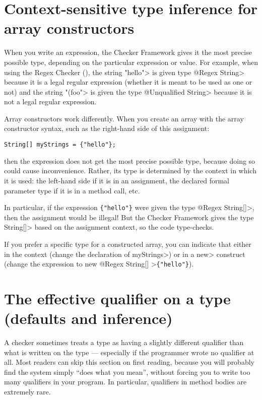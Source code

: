 \section{Context-sensitive type inference for array constructors\label{array-context-sensitive}}

When you write an expression, the Checker Framework gives it the most
precise possible type, depending on the particular expression or value.
For example, when using the Regex Checker (),
the string \<"hello"> is given type \<@Regex String> because it is a legal
regular expression (whether it is meant to be used as one or not) and the
string \<"(foo"> is given the type \<@Unqualified String> because it is not
a legal regular expression.

Array constructors work differently.  When you create an array with the
array constructor syntax, such as the right-hand side of this assignment:

\begin{Verbatim}
String[] myStrings = {"hello"};
\end{Verbatim}

\noindent
then the expression does not get the most precise possible type, because
doing so could cause inconvenience.  Rather, its type is determined by the
context in which it is used:  the left-hand side if it is in an assignment,
the declared formal parameter type if it is in a method call, etc.

In particular, if the expression \verb|{"hello"}| were given the type
\<@Regex String[]>, then the assignment would be illegal!  But the Checker
Framework gives the type \<String[]> based on the assignment context, so the code
type-checks.

If you prefer a specific type for a constructed array, you can indicate
that either in the context (change the declaration of \<myStrings>) or in a
\<new> construct (change the expression to \<new @Regex String[] >\verb|{"hello"}|).


\section{The effective qualifier on a type (defaults and inference)\label{effective-qualifier}}

A checker sometimes treats a type as having a slightly different qualifier
than what is written on the type --- especially if the programmer wrote no
qualifier at all.
Most readers can skip this section on first reading, because you will
probably find the system simply ``does what you mean'', without forcing
you to write too many qualifiers in your program.
In particular, qualifiers in method bodies are extremely rare.

